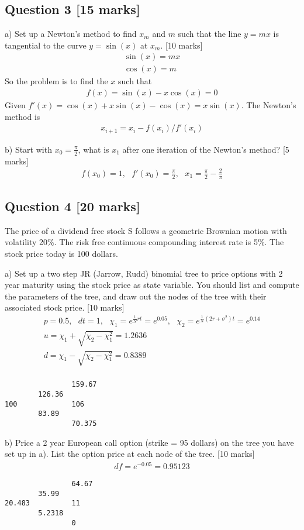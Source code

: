 \documentclass[11pt,a4paper,hidelinks,fleqn]{article}            %
\begin{document}
\subsection*{Question 3 [15 marks]} 
a) Set up a Newton's method to find $x_m$ and $m$ such that 
the line $y=mx$ is tangential to the curve $y = \sin(x)$ at $x_m$. [10 marks]
\begin{align*}
\sin(x) = mx \\
\cos(x) = m
\end{align*}
So the problem is to find the $x$ such that
\begin{align*}
f(x) = \sin(x) - x\cos(x) = 0
\end{align*}
Given $f'(x) = \cos(x) + x\sin(x) - \cos(x) = x \sin(x)$.
The Newton's method is
\begin{align*}
x_{i+1} = x_i - f(x_i) / f'(x_i)
\end{align*}

b) Start with $x_0 = \frac{\pi}{2}$, what is $x_1$ after one iteration of the Newton's method? [5 marks]
\begin{align*}
f(x_0) = 1, ~~~ f'(x_0) = \frac{\pi}{2}, ~~~ x_1 = \frac{\pi}{2} - \frac{2}{\pi}
\end{align*}

\subsection*{Question 4 [20 marks]}
The price of a dividend free stock S follows a geometric Brownian motion with volatility 20\%.
The risk free continuous compounding interest rate is 5\%. The stock price today is 100 dollars.

a) Set up a two step JR (Jarrow, Rudd) binomial tree to price options with 2 year maturity using the stock price as state variable.
You should list and compute the parameters of the tree, and draw out the nodes of the tree with their associated stock price. [10 marks]
\begin{align*}
p = 0.5, ~~~dt = 1, ~~~ \chi_1 = e^{\frac1N rt} = e^{0.05}, ~~~ \chi_2 = e^{\frac1N(2r+\sigma^2)t} = e^{0.14} \\
u = \chi_1 + \sqrt{\chi_2 - \chi_1^2} = 1.2636\\
d = \chi_1 - \sqrt{\chi_2 - \chi_1^2} = 0.8389\\
\end{align*}
\begin{verbatim}
                159.67
        126.36
100             106
        83.89
                70.375
\end{verbatim}
b) Price a 2 year European call option (strike = 95 dollars) on the tree you have set up in a). List the option price at each node of the tree.  [10 marks]
\begin{align*}
df = e^{-0.05} = 0.95123
\end{align*}
\begin{verbatim}
                64.67
        35.99 
20.483          11
        5.2318
                0
\end{verbatim}
\end{document}
